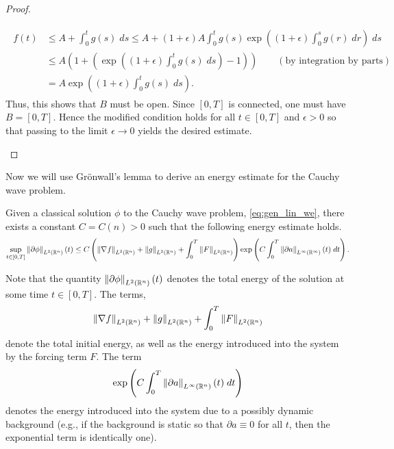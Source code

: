 \documentclass{article}
\numberwithin{equation}{section}
\begin{document}
\begin{proof}
\begin{enumerate}[itemsep =-2pt,label = (\arabic{*})]
\begin{align*}
\begin{split}
					f(t) &\leq A + \int_{0}^{t}g(s)\;ds \leq A + (1 + \epsilon)A\int_{0}^{t}g(s)\exp\left((1 + \epsilon)\int_{0}^{s}g(r)\;dr\right)\;ds \\
					&\leq A\left(1 + \left(\exp\left((1 + \epsilon)\int_{0}^{t}g(s)\;ds\right)-1\right)\right) \qquad (\text{by integration by parts}) \\
					&= A\exp\left((1 + \epsilon)\int_{0}^{t}g(s)\;ds\right). 
				\end{split}
			\end{align*}
			Thus, this shows that $B$ must be open. Since $[0,T]$ is connected, one must have $B = [0,T]$. Hence the modified condition holds for all $t \in [0,T]$ and $\epsilon > 0$ so that passing to the limit $\epsilon \to 0$ yields the desired estimate. 
		\end{enumerate}
	\end{proof}
	
	Now we will use Gr\"onwall's lemma to derive an energy estimate for the Cauchy wave problem. 
	\begin{prop}
		Given a classical solution $\phi$ to the Cauchy wave problem, \ref{eq:gen_lin_we}, there exists a constant $C = C(n) > 0$ such that the following energy estimate holds. 
		\begin{equation}
			\sup_{t \in [0,T]}\left\Vert \partial\phi \right\Vert_{L^{2}(\mathbb{R}^{n})}(t) \leq C\left(\left\Vert \nabla f \right\Vert_{L^{2}(\mathbb{R}^{n})} + \left\Vert g \right\Vert_{L^{2}(\mathbb{R}^{n})} + \int_{0}^{T}\left\Vert F \right\Vert_{L^{2}(\mathbb{R}^{n})}\right)\exp\left(C\int_{0}^{T}\left\Vert \partial a \right\Vert_{L^{\infty}(\mathbb{R}^{\infty})}(t)\;dt\right). 
		\end{equation}
	\end{prop}
	\begin{remark}
		Note that the quantity $\left\Vert \partial \phi \right\Vert_{L^{2}(\mathbb{R}^{n})}(t)$ denotes the total energy of the solution at some time $t \in [0,T]$. The terms, 
		\begin{equation*}
			\left\Vert \nabla f \right\Vert_{L^{2}(\mathbb{R}^{n})} + \left\Vert g \right\Vert_{L^{2}(\mathbb{R}^{n})} + \int_{0}^{T}\left\Vert F \right\Vert_{L^{2}(\mathbb{R}^{n})}
		\end{equation*}
		denote the total initial energy, as well as the energy introduced into the system by the forcing term $F$. The term 
		\begin{equation*}
			\exp\left(C\int_{0}^{T}\left\Vert \partial a \right\Vert_{L^{\infty}(\mathbb{R}^{n})}(t)\;dt\right)
		\end{equation*}
		denotes the energy introduced into the system due to a possibly dynamic background (e.g., if the background is static so that $\partial a \equiv 0$ for all $t$, then the exponential term is identically one). 
	\end{remark}
	
\end{document}

